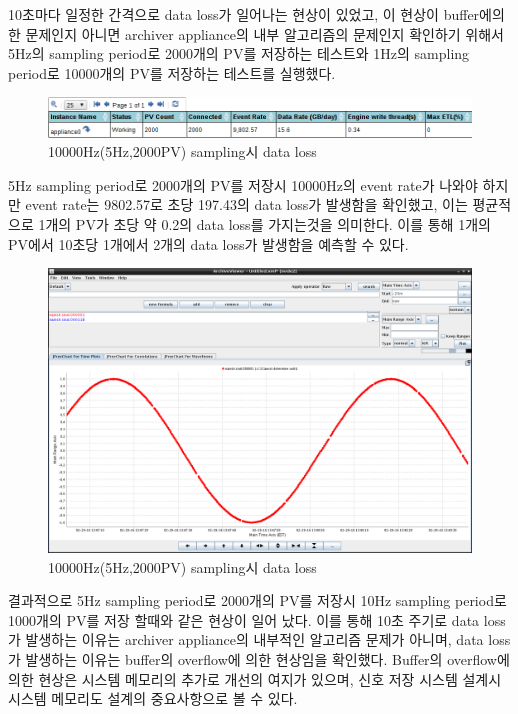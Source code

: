 \documentclass[11pt
  , a4paper
  , article
  , oneside
]{memoir}
\begin{document}
10초마다 일정한 간격으로 data loss가 일어나는 현상이 있었고, 이 현상이 buffer에의한 문제인지 아니면 archiver appliance의 내부 알고리즘의 문제인지 확인하기 위해서 5Hz의 sampling period로 2000개의 PV를 저장하는 테스트와 1Hz의 sampling period로 10000개의 PV를 저장하는 테스트를 실행했다.

		\begin{figure}[h!]
			\centering
			\includegraphics[width=1\textwidth, height=0.1\textheight]{./images/a3.png}
			\caption{10000Hz(5Hz,2000PV) sampling시 data loss}
		\end{figure}
	
5Hz sampling period로 2000개의 PV를 저장시 10000Hz의 event rate가 나와야 하지만 event rate는 9802.57로 초당 197.43의 data loss가 발생함을 확인했고, 이는 평균적으로 1개의 PV가 초당 약 0.2의 data loss를 가지는것을 의미한다. 이를 통해 1개의 PV에서 10초당 1개에서 2개의 data loss가 발생함을 예측할 수 있다.
		\begin{figure}[h!]
			\centering
			\includegraphics[width=1\textwidth, height=0.5\textheight]{./images/a2.png}
			\caption{10000Hz(5Hz,2000PV) sampling시 data loss}
		\end{figure}

결과적으로 5Hz sampling period로 2000개의 PV를 저장시 10Hz sampling period로 1000개의 PV를 저장 할때와 같은 현상이 일어 났다. 이를 통해 10초 주기로 data loss가 발생하는 이유는 archiver appliance의 내부적인 알고리즘 문제가 아니며, data loss가 발생하는 이유는 buffer의 overflow에 의한 현상임을 확인했다. Buffer의 overflow에 의한 현상은 시스템 메모리의 추가로 개선의 여지가 있으며, 신호 저장 시스템 설계시 시스템 메모리도 설계의 중요사항으로 볼 수 있다.
\end{document}
